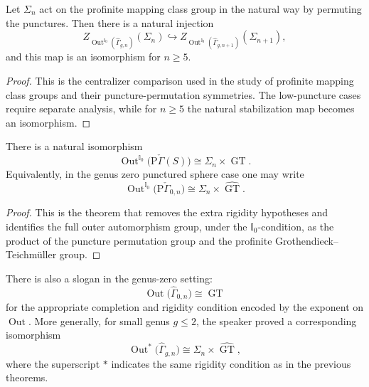 \begin{theorem}\label{thm:hoshi-mochizuki-centralizer}
Let \(\Sigma_n\) act on the profinite
mapping class group in the natural way by
permuting the punctures. Then there is a
natural injection
$$
Z_{\operatorname{Out}^{\mathbb{I}_0}
(\widehat{\Gamma}_{g,n})}(\Sigma_n)
\hookrightarrow
Z_{\operatorname{Out}^{\mathbb{I}_0}
(\widehat{\Gamma}_{g,n+1})}(\Sigma_{n+1}),
$$
and this map is an isomorphism for \(n\ge 5\).
\end{theorem}

\begin{proof}
This is the centralizer comparison used in
the study of profinite mapping class groups
and their puncture-permutation symmetries.
The low-puncture cases require separate
analysis, while for \(n\ge 5\) the natural
stabilization map becomes an isomorphism.
\end{proof}

\begin{theorem}\label{thm:hoshi-minamide-mochizuki}
There is a natural isomorphism
$$
\operatorname{Out}^{\mathbb{I}_0}
\bigl(\mathrm{P}\check\Gamma(S)\bigr)
\cong
\Sigma_n \times \widehat{\operatorname{GT}}.
$$
Equivalently, in the genus zero punctured
sphere case one may write
$$
\operatorname{Out}^{\mathbb{I}_0}
\bigl(\mathrm{P}\check\Gamma_{0,n}\bigr)
\cong
\Sigma_n \times \widehat{\operatorname{GT}}.
$$
\end{theorem}

\begin{proof}
This is the theorem that removes the extra
rigidity hypotheses and identifies the full
outer automorphism group, under the
\(\mathbb{I}_0\)-condition, as the product of
the puncture permutation group and the
profinite Grothendieck--Teichm\"uller group.
\end{proof}

\medskip\noindent
There is also a slogan in the genus-zero
setting:
$$
\operatorname{Out}\bigl(\widehat{\Gamma}_{0,n}\bigr)
\cong \widehat{\operatorname{GT}}
$$
for the appropriate completion and rigidity
condition encoded by the exponent on
\(\operatorname{Out}\). More generally, for
small genus \(g\leq 2\), the speaker proved a
corresponding isomorphism
$$
\operatorname{Out}^{\ast}\bigl(\widehat{\Gamma}_{g,n}\bigr)
\cong
\Sigma_n \times \widehat{\operatorname{GT}},
$$
where the superscript \(\ast\) indicates the
same rigidity condition as in the previous
theorems.



